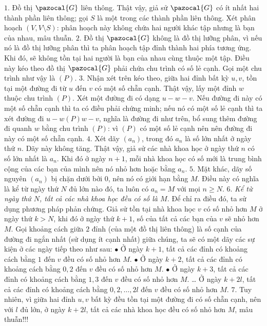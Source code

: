 \begin{multicols}{2}
	\vskip 0.1cm
	$1.$ Đồ thị $\pazocal{G}$ liên thông. Thật vậy, giả sử $\pazocal{G}$ có ít nhất hai thành phần liên thông; gọi $S$ là một trong các thành phần liên thông. Xét phân hoạch $(V, V \setminus S)$: phân hoạch này không chứa hai người khác tập nhưng là bạn của nhau, mâu thuẫn.
	\vskip 0.1cm
	$2.$ Đồ thị $\pazocal{G}$ không là đồ thị lưỡng phân, vì nếu nó là đồ thị lưỡng phân thì ta phân hoạch tập đỉnh thành hai phía tương ứng. Khi đó, sẽ không tồn tại hai người là bạn của nhau cùng thuộc một tập. Điều này kéo theo đồ thị $\pazocal{G}$ phải chứa chu trình có số lẻ cạnh. Gọi một chu trình như vậy là $(P)$. 
	\vskip 0.1cm
	$3.$  Nhận xét trên kéo theo, giữa hai đỉnh bất kỳ $u,v$, tồn tại một đường đi từ $u$ đến $v$ có một số chẵn cạnh. Thật vậy, lấy một đỉnh $w$ thuộc chu trình $(P)$. Xét một đường đi có dạng $u-w-v$. Nếu đường đi này có một số chẵn cạnh thì ta có điều phải chứng minh; nếu nó có một số lẻ cạnh thì ta xét đường đi $u-w(P)w-v$, nghĩa là đường đi như trên, bổ sung thêm đường đi quanh $w$ bằng chu trình $(P)$: vì $(P)$ có một số lẻ cạnh nên nên đường đi này có một số chẵn cạnh. 
	\vskip 0.1cm
	$4.$ Xét dãy $(a_n)$, trong đó $a_n$ là số lớn nhất ở ngày thứ $n$. Dãy này  không tăng. Thật vậy, giả sử các nhà khoa học ở ngày thứ $n$ có số lớn nhất là $a_n$. Khi đó ở ngày $n+1$, mỗi nhà khoa học có số mới là trung bình cộng của các bạn của mình nên nó nhỏ hơn hoặc bằng $a_n$.
	\vskip 0.1cm
	$5.$  Mặt khác, dãy số nguyên $(a_n)$ bị chặn dưới bởi $0$, nên nó có giới hạn bằng $M$. Điều này có nghĩa là kể từ ngày thứ $N$ đủ lớn nào đó, ta luôn có $a_n = M$ với mọi $n \geq N$. 
	\vskip 0.1cm
	$6.$  \textit{Kể từ ngày thứ $N$, tất cả các nhà khoa học đều có số là $M$.} Để chỉ ra điều đó, ta sử dụng phương pháp phản chứng. Giả sử tồn tại nhà khoa học $v$ có số nhỏ hơn $M$ ở ngày thứ $k>N$, khi đó ở ngày thứ $k+1$, số của tất cả các bạn của $v$ sẽ nhỏ hơn $M$. Gọi khoảng cách giữa $2$ đỉnh (của một đồ thị liên thông) là số cạnh của đường đi ngắn nhất (sử dụng ít cạnh nhất) giữa chúng, ta sẽ có một dãy các sự kiện ở các ngày tiếp theo như sau:
	\vskip 0.1cm
	$\bullet$ Ở ngày $k+1$, tất cả các đỉnh có khoảng cách bằng $1$ đến $v$ đều có  số nhỏ hơn $M$.
	\vskip 0.1cm
	$\bullet$ Ở ngày $k+2$, tất cả các đỉnh có khoảng cách bằng $0,2$ đến $v$ đều có  số nhỏ hơn $M$.
	\vskip 0.1cm
	$\bullet$ Ở ngày $k+3$, tất cả các đỉnh có khoảng cách bằng $1,3$ đến $v$ đều có số nhỏ hơn $M$.
	\vskip 0.1cm
	\dots
	\vskip 0.1cm Ở ngày $k+2l$, tất cả các đỉnh có khoảng cách bằng $0,2,\dots,2l$ đến $v$ đều có số nhỏ hơn $M$.
	\vskip 0.1cm  
	$7.$ Tuy nhiên, vì giữa hai đỉnh $u,v$ bất kỳ đều tồn tại một đường đi có số chẵn cạnh, nên với $l$ đủ lớn, ở ngày $k+2l$, tất cả các nhà khoa học đều có số nhỏ hơn $M$, mâu thuẫn!!!  

\end{multicols}
